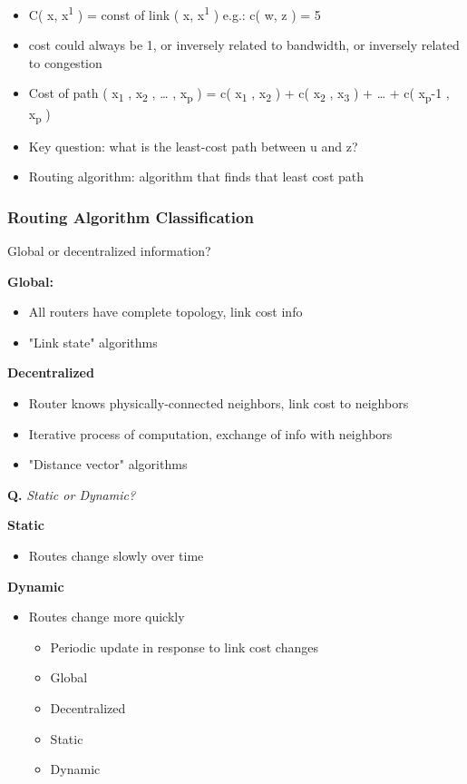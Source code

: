 \documentclass[11pt]{article}
\begin{document}
\begin{itemize}
\item C( x, x\textsuperscript{1} ) = const of link ( x, x\textsuperscript{1} ) e.g.: c( w, z ) = 5
\item cost could always be 1, or inversely related to bandwidth, or
inversely related to congestion
\item Cost of path ( x\textsubscript{1} , x\textsubscript{2} , \ldots{} , x\textsubscript{p} ) = c( x\textsubscript{1} , x\textsubscript{2} ) + c( x\textsubscript{2} ,
x\textsubscript{3} ) + \ldots{} + c( x\textsubscript{p}-1 , x\textsubscript{p} )

\item Key question: what is the least-cost path between u and z?

\item Routing algorithm: algorithm that finds that least cost path
\end{itemize}

\subsubsection{Routing Algorithm Classification}
\label{sec:org5f83d4c}
Global or decentralized information?

\textbf{Global:}
\begin{itemize}
\item All routers have complete topology, link cost info
\item "Link state" algorithms
\end{itemize}

\textbf{Decentralized}
\begin{itemize}
\item Router knows physically-connected neighbors, link cost to neighbors
\item Iterative process of computation, exchange of info with neighbors
\item "Distance vector" algorithms
\end{itemize}

\textbf{Q.} \emph{Static or Dynamic?}

\textbf{Static}
\begin{itemize}
\item Routes change slowly over time
\end{itemize}

\textbf{Dynamic}
\begin{itemize}
\item Routes change more quickly
\begin{itemize}
\item Periodic update in response to link cost changes
\item Global
\item Decentralized
\item Static
\item Dynamic
\end{itemize}
\end{itemize}
\end{document}
